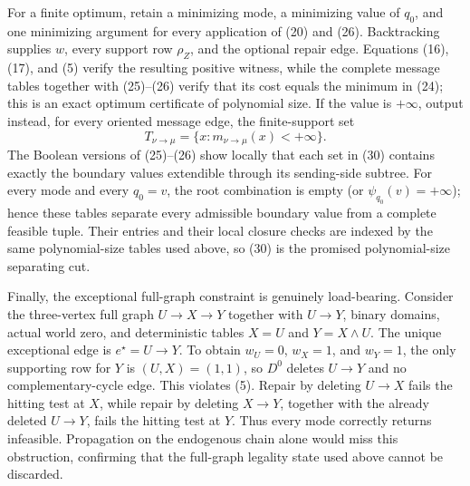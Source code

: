 For a finite optimum, retain a minimizing mode, a minimizing value of \(q_0\), and one minimizing argument for every application of (20) and (26).  Backtracking supplies \(w\), every support row \(\rho_Z\), and the optional repair edge.  Equations (16), (17), and (5) verify the resulting positive witness, while the complete message tables together with (25)--(26) verify that its cost equals the minimum in (24); this is an exact optimum certificate of polynomial size.  If the value is \(+\infty\), output instead, for every oriented message edge, the finite-support set
\[
 T_{\nu\to\mu}=\{x:m_{\nu\to\mu}(x)<+\infty\}.                    \tag{30}
\]
The Boolean versions of (25)--(26) show locally that each set in (30) contains exactly the boundary values extendible through its sending-side subtree.  For every mode and every \(q_0=v\), the root combination is empty (or \(\psi_{q_0}(v)=+\infty\)); hence these tables separate every admissible boundary value from a complete feasible tuple.  Their entries and their local closure checks are indexed by the same polynomial-size tables used above, so (30) is the promised polynomial-size separating cut.

Finally, the exceptional full-graph constraint is genuinely load-bearing.  Consider the three-vertex full graph \(U\to X\to Y\) together with \(U\to Y\), binary domains, actual world zero, and deterministic tables \(X=U\) and \(Y=X\wedge U\).  The unique exceptional edge is \(e^\star=U\to Y\).  To obtain \(w_U=0\), \(w_X=1\), and \(w_Y=1\), the only supporting row for \(Y\) is \((U,X)=(1,1)\), so \(D^0\) deletes \(U\to Y\) and no complementary-cycle edge.  This violates (5).  Repair by deleting \(U\to X\) fails the hitting test at \(X\), while repair by deleting \(X\to Y\), together with the already deleted \(U\to Y\), fails the hitting test at \(Y\).  Thus every mode correctly returns infeasible.  Propagation on the endogenous chain alone would miss this obstruction, confirming that the full-graph legality state used above cannot be discarded.
